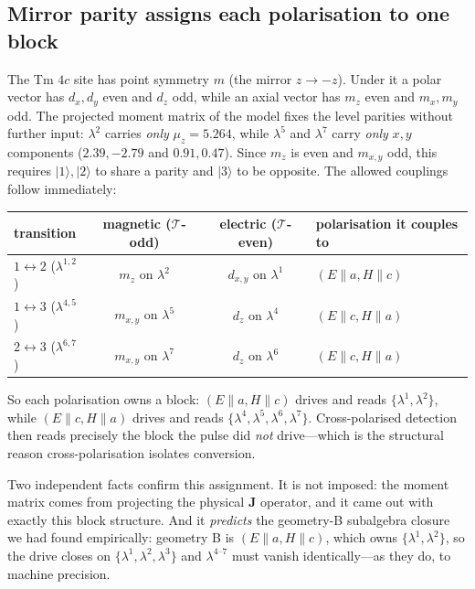 \documentclass[11pt]{article}
\newcommand{\ket}[1]{|#1\rangle}
\newcommand{\ve}[1]{\boldsymbol{#1}}
\begin{document}
\subsection{Mirror parity assigns each polarisation to one block}

The Tm $4c$ site has point symmetry $m$ (the mirror $z\to-z$).  Under
it a polar vector has $d_{x},d_{y}$ even and $d_z$ odd, while an axial
vector has $m_z$ even and $m_{x},m_{y}$ odd.  The projected moment
matrix of the model fixes the level parities without further input:
$\lambda^2$ carries \emph{only} $\mu_z=5.264$, while $\lambda^5$ and
$\lambda^7$ carry \emph{only} $x,y$ components
($2.39,-2.79$ and $0.91,0.47$).  Since $m_z$ is even and $m_{x,y}$ odd,
this requires $\ket1,\ket2$ to share a parity and $\ket3$ to be
opposite.  The allowed couplings follow immediately:
\begin{center}\small
\renewcommand{\arraystretch}{1.3}
\begin{tabular}{lccl}
\toprule
transition & magnetic ($\mathcal T$-odd) & electric ($\mathcal T$-even)
& polarisation it couples to\\
\midrule
$1\!\leftrightarrow\!2$ ($\lambda^{1,2}$) & $m_z$ on $\lambda^2$ &
  $d_{x,y}$ on $\lambda^1$ & $(E\!\parallel\!a,H\!\parallel\!c)$\\
$1\!\leftrightarrow\!3$ ($\lambda^{4,5}$) & $m_{x,y}$ on $\lambda^5$ &
  $d_z$ on $\lambda^4$ & $(E\!\parallel\!c,H\!\parallel\!a)$\\
$2\!\leftrightarrow\!3$ ($\lambda^{6,7}$) & $m_{x,y}$ on $\lambda^7$ &
  $d_z$ on $\lambda^6$ & $(E\!\parallel\!c,H\!\parallel\!a)$\\
\bottomrule
\end{tabular}
\end{center}
So each polarisation owns a block: $(E\!\parallel\!a,H\!\parallel\!c)$
drives and reads $\{\lambda^1,\lambda^2\}$, while
$(E\!\parallel\!c,H\!\parallel\!a)$ drives and reads
$\{\lambda^4,\lambda^5,\lambda^6,\lambda^7\}$.  Cross-polarised
detection then reads precisely the block the pulse did \emph{not}
drive---which is the structural reason cross-polarisation isolates
conversion.

Two independent facts confirm this assignment.  It is not imposed: the
moment matrix comes from projecting the physical $\ve J$ operator, and
it came out with exactly this block structure.  And it \emph{predicts}
the geometry-B subalgebra closure we had found empirically: geometry B
is $(E\!\parallel\!a,H\!\parallel\!c)$, which owns $\{\lambda^1,
\lambda^2\}$, so the drive closes on $\{\lambda^1,\lambda^2,\lambda^3\}$
and $\lambda^{4\text{--}7}$ must vanish identically---as they do, to
machine precision.
\end{document}
